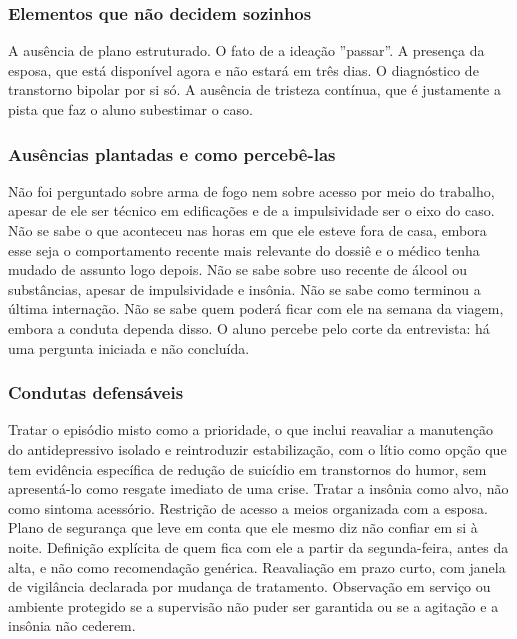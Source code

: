 \subsubsection*{Elementos que não decidem sozinhos}

A ausência de plano estruturado. O fato de a ideação ''passar''. A presença da esposa, que está disponível agora e não estará em três dias. O diagnóstico de transtorno bipolar por si só. A ausência de tristeza contínua, que é justamente a pista que faz o aluno subestimar o caso.

\subsubsection*{Ausências plantadas e como percebê-las}

Não foi perguntado sobre arma de fogo nem sobre acesso por meio do trabalho, apesar de ele ser técnico em edificações e de a impulsividade ser o eixo do caso. Não se sabe o que aconteceu nas horas em que ele esteve fora de casa, embora esse seja o comportamento recente mais relevante do dossiê e o médico tenha mudado de assunto logo depois. Não se sabe sobre uso recente de álcool ou substâncias, apesar de impulsividade e insônia. Não se sabe como terminou a última internação. Não se sabe quem poderá ficar com ele na semana da viagem, embora a conduta dependa disso. O aluno percebe pelo corte da entrevista: há uma pergunta iniciada e não concluída.

\subsubsection*{Condutas defensáveis}

Tratar o episódio misto como a prioridade, o que inclui reavaliar a manutenção do antidepressivo isolado e reintroduzir estabilização, com o lítio como opção que tem evidência específica de redução de suicídio em transtornos do humor, sem apresentá-lo como resgate imediato de uma crise. Tratar a insônia como alvo, não como sintoma acessório. Restrição de acesso a meios organizada com a esposa. Plano de segurança que leve em conta que ele mesmo diz não confiar em si à noite. Definição explícita de quem fica com ele a partir da segunda-feira, antes da alta, e não como recomendação genérica. Reavaliação em prazo curto, com janela de vigilância declarada por mudança de tratamento. Observação em serviço ou ambiente protegido se a supervisão não puder ser garantida ou se a agitação e a insônia não cederem.

